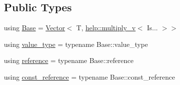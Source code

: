\subsection*{Public Types}
{\bf }\par
\begin{DoxyCompactItemize}
\item 
using \hyperlink{classcnt_1_1help_1_1Container_a0996cbe40d133dbec82facc6a17cf1f8}{Base} = \hyperlink{structcnt_1_1Vector}{Vector}$<$ T, \hyperlink{namespacecnt_1_1help_ab018f6aa5c1016ecf5d0d825cf8d362f}{help\+::multiply\+\_\+v}$<$ Is... $>$$>$
\item 
using \hyperlink{classcnt_1_1help_1_1Container_ada2fa1912d0bac79c0c631fe9a804027}{value\+\_\+type} = typename Base\+::value\+\_\+type
\item 
using \hyperlink{classcnt_1_1help_1_1Container_a11ea1092d03b288fe285601e98f7236c}{reference} = typename Base\+::reference
\item 
using \hyperlink{classcnt_1_1help_1_1Container_a388ebfcebe3759453a569af7d57267b5}{const\+\_\+reference} = typename Base\+::const\+\_\+reference
\end{DoxyCompactItemize}

